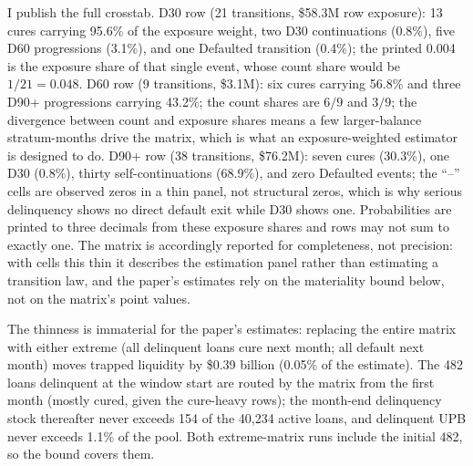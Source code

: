 \documentclass[12pt]{article}
\begin{document}
I publish the full crosstab. D30 row (21 transitions, \$58.3M row exposure): 13 cures carrying 95.6\% of the exposure weight, two D30 continuations (0.8\%), five D60 progressions (3.1\%), and one Defaulted transition (0.4\%); the printed 0.004 is the exposure share of that single event, whose count share would be $1/21 = 0.048$. D60 row (9 transitions, \$3.1M): six cures carrying 56.8\% and three D90+ progressions carrying 43.2\%; the count shares are $6/9$ and $3/9$; the divergence between count and exposure shares means a few larger-balance stratum-months drive the matrix, which is what an exposure-weighted estimator is designed to do. D90+ row (38 transitions, \$76.2M): seven cures (30.3\%), one D30 (0.8\%), thirty self-continuations (68.9\%), and zero Defaulted events; the ``--'' cells are observed zeros in a thin panel, not structural zeros, which is why serious delinquency shows no direct default exit while D30 shows one. Probabilities are printed to three decimals from these exposure shares and rows may not sum to exactly one. The matrix is accordingly reported for completeness, not precision: with cells this thin it describes the estimation panel rather than estimating a transition law, and the paper's estimates rely on the materiality bound below, not on the matrix's point values.

The thinness is immaterial for the paper's estimates: replacing the entire matrix with either extreme (all delinquent loans cure next month; all default next month) moves trapped liquidity by \$0.39 billion (0.05\% of the estimate). The 482 loans delinquent at the window start are routed by the matrix from the first month (mostly cured, given the cure-heavy rows); the month-end delinquency stock thereafter never exceeds 154 of the 40,234 active loans, and delinquent UPB never exceeds 1.1\% of the pool. Both extreme-matrix runs include the initial 482, so the bound covers them.
\end{document}
